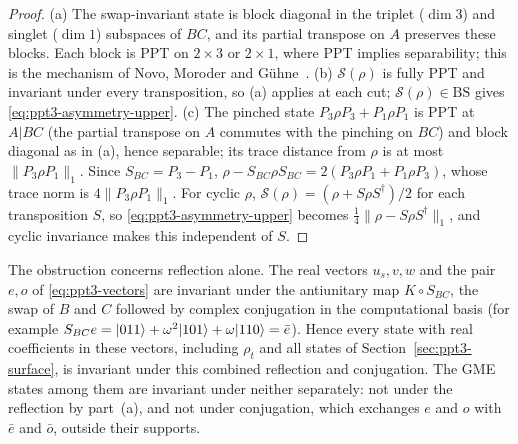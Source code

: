 \begin{proof}
(a) The swap-invariant state is block diagonal in the triplet ($\dim3$) and singlet ($\dim1$) subspaces of $BC$, and its
partial transpose on $A$ preserves these blocks. Each block is PPT on $2\times3$ or $2\times1$, where PPT implies
separability; this is the mechanism of Novo, Moroder and G\"uhne~\cite[Sec.~III.2]{NMG}. (b) $\mathcal S(\rho)$ is fully
PPT and invariant under every transposition, so (a) applies at each cut; $\mathcal S(\rho)\in\mathrm{BS}$ gives
\eqref{eq:ppt3-asymmetry-upper}. (c) The pinched state
$P_3\rho P_3+P_1\rho P_1$ is PPT at $A|BC$ (the partial transpose on $A$ commutes with the pinching on $BC$) and block diagonal as
in (a), hence separable; its trace distance from $\rho$ is at most $\|P_3\rho P_1\|_1$. Since
$S_{BC}=P_3-P_1$, $\rho-S_{BC}\rho S_{BC}=2(P_3\rho P_1+P_1\rho P_3)$, whose trace norm is $4\|P_3\rho P_1\|_1$. For cyclic $\rho$,
$\mathcal S(\rho)=(\rho+S\rho S^\dagger)/2$ for each transposition $S$, so \eqref{eq:ppt3-asymmetry-upper} becomes $\frac14\|\rho-S\rho S^\dagger\|_1$,
and cyclic invariance makes this independent of $S$.
\end{proof}

The obstruction concerns reflection alone. The real vectors $u_s,v,w$ and the pair $e,o$ of \eqref{eq:ppt3-vectors} are invariant under the
antiunitary map $K\circ S_{BC}$, the swap of $B$ and $C$ followed by complex conjugation in the computational basis
(for example $S_{BC}e=\lvert011\rangle+\omega^2\lvert101\rangle+\omega\lvert110\rangle=\bar e$). Hence every state with real coefficients in
these vectors, including $\rho_t$ and all states of Section~\ref{sec:ppt3-surface}, is invariant under this combined
reflection and conjugation. The GME states among them are invariant under neither separately: not under the reflection by
part~(a), and not under conjugation, which exchanges $e$ and $o$ with $\bar e$ and $\bar o$, outside their supports.

